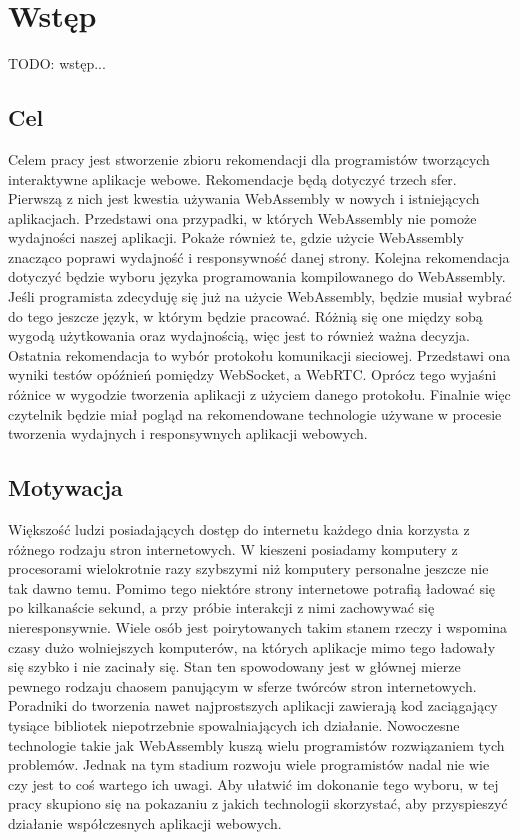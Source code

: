 \documentclass[language=polish,type=master]{aghmodern}
\author{Piotr Szczygieł}
\date{2022}
\begin{document}
\frontmatter
\maketitle

\setcounter{tocdepth}{1}
\tableofcontents

\mainmatter

\onehalfspacing

\chapter{Wstęp}
TODO: wstęp...

\section{Cel}
Celem pracy jest stworzenie zbioru rekomendacji dla programistów tworzących interaktywne aplikacje webowe.
Rekomendacje będą dotyczyć trzech sfer.
Pierwszą z nich jest kwestia używania WebAssembly w nowych i istniejących aplikacjach.
Przedstawi ona przypadki, w których WebAssembly nie pomoże wydajności naszej aplikacji.
Pokaże również te, gdzie użycie WebAssembly znacząco poprawi wydajność i responsywność danej strony.
Kolejna rekomendacja dotyczyć będzie wyboru języka programowania kompilowanego do WebAssembly.
Jeśli programista zdecyduję się już na użycie WebAssembly, będzie musiał wybrać do tego jeszcze język, w którym będzie pracować.
Różnią się one między sobą wygodą użytkowania oraz wydajnością, więc jest to również ważna decyzja.
Ostatnia rekomendacja to wybór protokołu komunikacji sieciowej.
Przedstawi ona wyniki testów opóźnień pomiędzy WebSocket, a WebRTC.
Oprócz tego wyjaśni różnice w wygodzie tworzenia aplikacji z użyciem danego protokołu.
Finalnie więc czytelnik będzie miał pogląd na rekomendowane technologie używane w procesie tworzenia wydajnych i responsywnych aplikacji webowych.

\section{Motywacja}
Większość ludzi posiadających dostęp do internetu każdego dnia korzysta z różnego rodzaju stron internetowych.
W kieszeni posiadamy komputery z procesorami wielokrotnie razy szybszymi niż komputery personalne jeszcze nie tak dawno temu.
Pomimo tego niektóre strony internetowe potrafią ładować się po kilkanaście sekund, a przy próbie interakcji z nimi zachowywać się nieresponsywnie.
Wiele osób jest poirytowanych takim stanem rzeczy i wspomina czasy dużo wolniejszych komputerów, na których aplikacje mimo tego ładowały się szybko i nie zacinały się.
Stan ten spowodowany jest w głównej mierze pewnego rodzaju chaosem panującym w sferze twórców stron internetowych.
Poradniki do tworzenia nawet najprostszych aplikacji zawierają kod zaciągający tysiące bibliotek niepotrzebnie spowalniających ich działanie.
Nowoczesne technologie takie jak WebAssembly kuszą wielu programistów rozwiązaniem tych problemów.
Jednak na tym stadium rozwoju wiele programistów nadal nie wie czy jest to coś wartego ich uwagi.
Aby ułatwić im dokonanie tego wyboru, w tej pracy skupiono się na pokazaniu z jakich technologii skorzystać, aby przyspieszyć działanie współczesnych aplikacji webowych.
\end{document}
